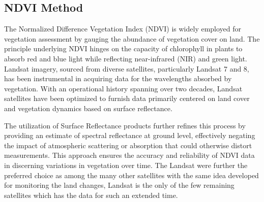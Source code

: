 \documentclass[12pt,a4paper,IEEEtran]{article}
\begin{document}




\subsection[3.3]{NDVI Method}
The Normalized Difference Vegetation Index (NDVI) is widely employed for vegetation assessment by gauging the abundance of vegetation cover on land. The principle underlying NDVI hinges on the capacity of chlorophyll in plants to absorb red and blue light while reflecting near-infrared (NIR) and green light. Landsat imagery, sourced from diverse satellites, particularly Landsat 7 and 8, has been instrumental in acquiring data for the wavelengths absorbed by vegetation. With an operational history spanning over two decades, Landsat satellites have been optimized to furnish data primarily centered on land cover and vegetation dynamics based on surface reflectance. 

The utilization of Surface Reflectance products further refines this process by providing an estimate of spectral reflectance at ground level, effectively negating the impact of atmospheric scattering or absorption that could otherwise distort measurements. This approach ensures the accuracy and reliability of NDVI data in discerning variations in vegetation over time. The Landsat were further the preferred choice as among the many other satellites with the same idea developed for monitoring the land changes, Landsat is the only of the few remaining satellites which has the data for such an extended time. 
\end{document}
